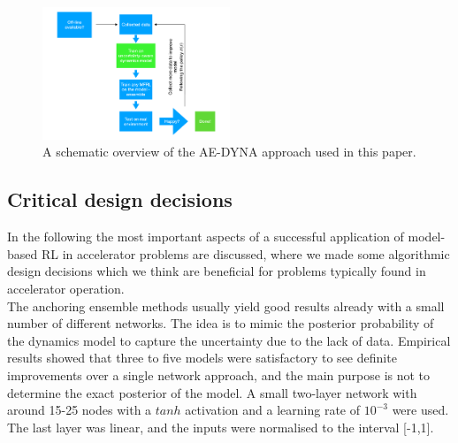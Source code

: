 \documentclass[
reprint,
amsmath,amssymb,amsfonts,clevref,
aps,
prstab,
]{revtex4-2}
\begin{document}
	\begin{figure}[!h]
		\centering
		\includegraphics*[width=0.5\textwidth]{Figures/MBRL_overview}
		\caption{A schematic overview of the AE-DYNA approach used in this paper.}
		\label{fig:MBRL_overview}
	\end{figure}
	\subsection{Critical design decisions}\label{ss:critical_design}
	In the following the most important aspects of a successful application of model-based RL in accelerator problems are discussed, where we made some algorithmic design decisions which we think are beneficial for problems typically found in accelerator operation.\\
	The anchoring ensemble methods usually yield good results already with a small number of different networks. The idea is to mimic the posterior probability of the dynamics model to capture the uncertainty due to the lack of data. Empirical results showed that three to five models were satisfactory to see definite improvements over a single network approach, and the main purpose is not to determine the exact posterior of the model. A small two-layer network with around 15-25 nodes with a $tanh$ activation and a learning rate of $10^{-3}$ were used. The last layer was linear, and the inputs were normalised to the interval [-1,1].\\
\end{document}
